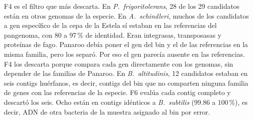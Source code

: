 \begin{table}[htbp]
\centering
\footnotesize
\setlength{\tabcolsep}{4pt}
\caption[Embudo de genes específicos de la cepa]{Candidatos que sobreviven a
cada filtro. Entre paréntesis, cuántos del total proceden de genes eliminados
por Panaroo.}
\label{tab:embudo_especificos}
\end{table}

F4 es el filtro que más descarta. En \textit{P.~frigoritolerans}, 28 de los 29
candidatos están en otros genomas de la especie. En \textit{A.~schindleri}, muchos de los candidatos a gen específico de la cepa
de la Estela sí estaban en las referencias del pangenoma, con 80 a 97\,\% de
identidad. Eran integrasas, transposasas y proteínas de fago. Panaroo debía
poner el gen del bin y el de las referencias en la misma familia, pero los
separó. Por eso el gen parecía ausente en las referencias. F4 los descarta
porque compara cada gen directamente con los genomas, sin depender de las
familias de Panaroo.
En \textit{B.~altitudinis}, 12 candidatos estaban en seis contigs huérfanos,
es decir, contigs del bin que no comparten ninguna familia de genes con las
referencias de la especie. F6 evalúa cada contig completo y descartó los seis.
Ocho están en contigs idénticos a \textit{B.~subtilis} (99.86 a 100\,\%), es
decir, ADN de otra bacteria de la muestra asignado al bin por error.

